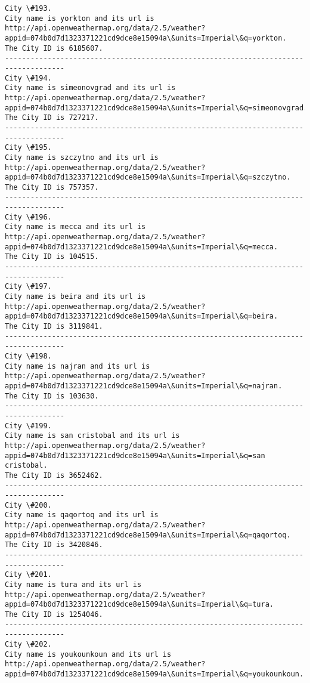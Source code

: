 \documentclass[11pt]{article}
\begin{document}
\begin{Verbatim}[commandchars=\\\{\}]
City \#193.
City name is yorkton and its url is http://api.openweathermap.org/data/2.5/weather?appid=074b0d7d1323371221cd9dce8e15094a\&units=Imperial\&q=yorkton.
The City ID is 6185607.
------------------------------------------------------------------------------------
City \#194.
City name is simeonovgrad and its url is http://api.openweathermap.org/data/2.5/weather?appid=074b0d7d1323371221cd9dce8e15094a\&units=Imperial\&q=simeonovgrad.
The City ID is 727217.
------------------------------------------------------------------------------------
City \#195.
City name is szczytno and its url is http://api.openweathermap.org/data/2.5/weather?appid=074b0d7d1323371221cd9dce8e15094a\&units=Imperial\&q=szczytno.
The City ID is 757357.
------------------------------------------------------------------------------------
City \#196.
City name is mecca and its url is http://api.openweathermap.org/data/2.5/weather?appid=074b0d7d1323371221cd9dce8e15094a\&units=Imperial\&q=mecca.
The City ID is 104515.
------------------------------------------------------------------------------------
City \#197.
City name is beira and its url is http://api.openweathermap.org/data/2.5/weather?appid=074b0d7d1323371221cd9dce8e15094a\&units=Imperial\&q=beira.
The City ID is 3119841.
------------------------------------------------------------------------------------
City \#198.
City name is najran and its url is http://api.openweathermap.org/data/2.5/weather?appid=074b0d7d1323371221cd9dce8e15094a\&units=Imperial\&q=najran.
The City ID is 103630.
------------------------------------------------------------------------------------
City \#199.
City name is san cristobal and its url is http://api.openweathermap.org/data/2.5/weather?appid=074b0d7d1323371221cd9dce8e15094a\&units=Imperial\&q=san cristobal.
The City ID is 3652462.
------------------------------------------------------------------------------------
City \#200.
City name is qaqortoq and its url is http://api.openweathermap.org/data/2.5/weather?appid=074b0d7d1323371221cd9dce8e15094a\&units=Imperial\&q=qaqortoq.
The City ID is 3420846.
------------------------------------------------------------------------------------
City \#201.
City name is tura and its url is http://api.openweathermap.org/data/2.5/weather?appid=074b0d7d1323371221cd9dce8e15094a\&units=Imperial\&q=tura.
The City ID is 1254046.
------------------------------------------------------------------------------------
City \#202.
City name is youkounkoun and its url is http://api.openweathermap.org/data/2.5/weather?appid=074b0d7d1323371221cd9dce8e15094a\&units=Imperial\&q=youkounkoun.

\end{Verbatim}
\end{document}
